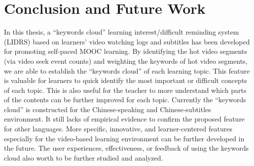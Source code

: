 \chapter{Conclusion and Future Work}\label{cha:Conclusion}
In this thesis, a “keywords cloud” learning interest/difficult reminding system (LIDRS) based on learners’ video watching logs and subtitles has been developed for promoting self-paced MOOC learning.
By identifying the hot video segments (via video seek event counts) and weighting the keywords of hot video segments, we are able to establish the “keywords cloud” of each learning topic.
This feature is valuable for learners to quick identify the most important or difficult concepts of each topic.
This is also useful for the teacher to more understand which parts of the contents can be further improved for each topic.
Currently the “keywords cloud” is constructed for the Chinese-speaking and Chinese-subtitles environment.
It still lacks of empirical evidence to confirm the proposed feature for other languages.
More specific, innovative, and learner-centered features especially for the video-based learning environment can be further developed in the future.
The user experiences, effectiveness, or feedback of using the keywords cloud also worth to be further studied and analyzed.
